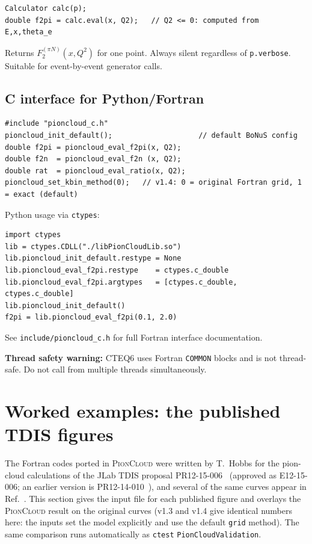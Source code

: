 \documentclass[11pt,a4paper]{article}
\newcommand{\picloud}{\textsc{PionCloud}}
\newcommand{\code}[1]{\texttt{#1}}
\begin{document}
\begin{lstlisting}[style=cppstyle]
Calculator calc(p);
double f2pi = calc.eval(x, Q2);   // Q2 <= 0: computed from E,x,theta_e
\end{lstlisting}

Returns $F_2^{(\pi N)}(x,Q^2)$ for one point. Always silent regardless
of \code{p.verbose}. Suitable for event-by-event generator calls.

\subsection{C interface for Python/Fortran}

\begin{lstlisting}[style=cppstyle]
#include "pioncloud_c.h"
pioncloud_init_default();                    // default BoNuS config
double f2pi = pioncloud_eval_f2pi(x, Q2);
double f2n  = pioncloud_eval_f2n (x, Q2);
double rat  = pioncloud_eval_ratio(x, Q2);
pioncloud_set_kbin_method(0);   // v1.4: 0 = original Fortran grid, 1 = exact (default)
\end{lstlisting}

Python usage via \code{ctypes}:
\begin{lstlisting}[style=bashstyle]
import ctypes
lib = ctypes.CDLL("./libPionCloudLib.so")
lib.pioncloud_init_default.restype = None
lib.pioncloud_eval_f2pi.restype    = ctypes.c_double
lib.pioncloud_eval_f2pi.argtypes   = [ctypes.c_double, ctypes.c_double]
lib.pioncloud_init_default()
f2pi = lib.pioncloud_eval_f2pi(0.1, 2.0)
\end{lstlisting}

See \texttt{include/pioncloud\_c.h} for full Fortran interface documentation.

\textbf{Thread safety warning:} CTEQ6 uses Fortran \texttt{COMMON} blocks
and is not thread-safe.  Do not call from multiple threads simultaneously.

\section{Worked examples: the published TDIS figures}
\label{sec:validation}

The Fortran codes ported in \picloud{} were written by T.~Hobbs for the
pion-cloud calculations of the JLab TDIS proposal PR12-15-006~\cite{TDIS15}
(approved as E12-15-006; an earlier version is PR12-14-010~\cite{TDIS14}),
and several of the same curves appear in Ref.~\cite{Hobbs15}.
This section gives the input file for each published figure and overlays
the \picloud{} result on the original curves (v1.3 and v1.4 give
identical numbers here: the inputs set the model explicitly and use the
default \texttt{grid} method).  The same comparison runs automatically as
\texttt{ctest} \texttt{PionCloudValidation}.
\end{document}
